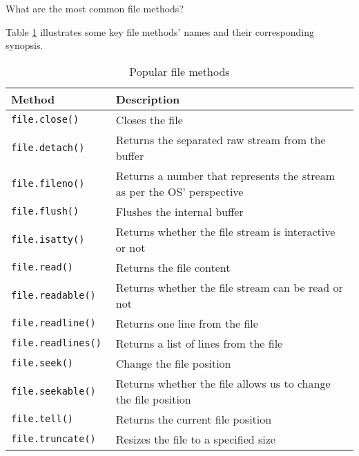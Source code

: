 \documentclass[a4paper,11pt]{book}
\numberwithin{figure}{chapter}
\numberwithin{table}{chapter}
\newcommand{\question}[1]{%
    \begin{tcolorbox}[colback=comp_c!10,colframe=comp_c,sidebyside align=top,width=\linewidth,before skip=1ex]
        #1
    \end{tcolorbox}%
    \switchcolumn%
}
\newcommand{\note}[1]{%
    \begin{tcolorbox}[colback=white!0,colframe=white!10,width=\linewidth,before skip=1ex]
        #1
    \end{tcolorbox}         
}
\begin{document}
\begin{paracol}{2}
	\question{\raggedright What are the most common file methods?}
	\note{Table \ref{tab:file-methods} illustrates some key file methods' names and their corresponding synopsis.}
\end{paracol}

\begin{table}[!htbp]
	\caption{Popular file methods}
	\label{tab:file-methods}
	\centering
	\begin{tabular}{ll}
		\toprule \toprule
		Method       & Description                                                                          \\
		\midrule
		\texttt{file.close()     } & Closes the file                                                                      \\
		\texttt{file.detach()    } & Returns the separated raw stream from the buffer                                     \\
		\texttt{file.fileno()    } & Returns a number that represents the stream as per the OS' perspective \\
		\texttt{file.flush()     } & Flushes the internal buffer                                                          \\
		\texttt{file.isatty()    } & Returns whether the file stream is interactive or not                                \\
		\texttt{file.read()      } & Returns the file content                                                             \\
		\texttt{file.readable()  } & Returns whether the file stream can be read or not                                   \\
		\texttt{file.readline()  } & Returns one line from the file                                                       \\
		\texttt{file.readlines() } & Returns a list of lines from the file                                                \\
		\texttt{file.seek()      } & Change the file position                                                             \\
		\texttt{file.seekable()  } & Returns whether the file allows us to change the file position                       \\
		\texttt{file.tell()      } & Returns the current file position                                                    \\
		\texttt{file.truncate()  } & Resizes the file to a specified size                                                 \\

\end{tabular}
\end{table}
\end{document}
